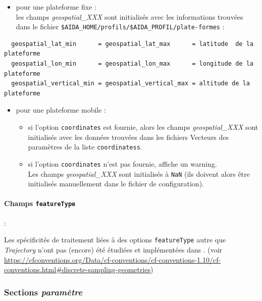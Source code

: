\begin{itemize}
\item
  pour une plateforme fixe :\\
  les champs \textit{geospatial\_XXX} sont initialisés avec les
  informations trouvées dans le fichier
  \texttt{\$AIDA\_HOME/profils/\$AIDA\_PROFIL/plate-formes} :
\end{itemize}

\begin{verbatim}
  geospatial_lat_min      = geospatial_lat_max      = latitude  de la plateforme
  geospatial_lon_min      = geospatial_lon_max      = longitude de la plateforme
  geospatial_vertical_min = geospatial_vertical_max = altitude de la plateforme
\end{verbatim}

\begin{itemize}
\item
  pour une plateforme mobile :\\

  \begin{itemize}
  \item
    si l'option \texttt{coordinates} est fournie, alors les champs
    \textit{geospatial\_XXX} sont initialisés avec les données trouvées
    dans les fichiers Vecteurs des paramètres de la liste \texttt{coordinatess}.
  \item
    si l'option \texttt{coordinates} n'est pas fournie, \prodcdf
    affiche un warning.\\
    Les champs \textit{geospatial\_XXX} sont initialisés à \texttt{NaN}
    (ils doivent alors être initialisés manuellement dans le fichier de
    configuration).
  \end{itemize}
\end{itemize}


\paragraph{Champs \texttt{featureType}} : \label{ref:featureType}

Les spécificités de traitement liées à des options \texttt{featureType}
autre que \textit{Trajectory} n'ont pas (encore) été étudiées et
implémentées dans \prodcdf. (voir
\url{https://cfconventions.org/Data/cf-conventions/cf-conventions-1.10/cf-conventions.html\#discrete-sampling-geometries})

\subsubsection{Sections \textit{paramètre}}

